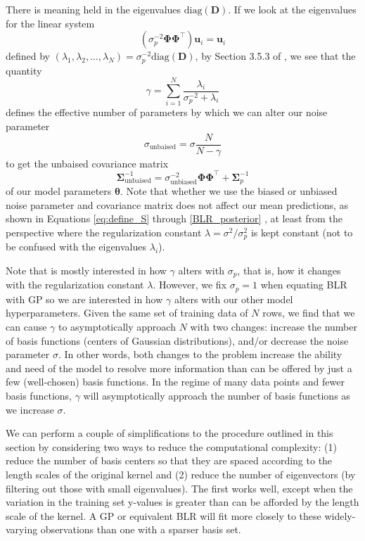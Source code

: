 \documentclass{article}
\begin{document}
There is meaning held in the eigenvalues $\text{diag}(\mathbf{D})$. If we look at the eigenvalues for the linear system \begin{equation}\left(\sigma_p^{-2}\boldsymbol{\Phi}\boldsymbol{\Phi}^\top\right)\mathbf{u}_i=\mathbf{u}_i\end{equation} defined by $(\lambda_1,\lambda_2,\dots,\lambda_N)=\sigma_p^{-2}\text{diag}(\mathbf{D})$, by Section 3.5.3 of \cite{bishop}, we see that the quantity
\begin{equation}
\gamma=\sum_{i=1}^{N}\frac{\lambda_i}{\sigma_p^{-2} + \lambda_i}
\end{equation} defines the effective number of parameters by which we can alter our noise parameter \begin{equation}\sigma_\text{unbaised}=\sigma\frac{N}{N-\gamma}\end{equation} to get the unbaised covariance matrix \begin{equation}\boldsymbol{\Sigma}_\text{unbaised}^{-1}=\sigma_\text{unbiased}^{-2}\boldsymbol{\Phi}\boldsymbol{\Phi}^\top+\boldsymbol{\Sigma}_p^{-1}\end{equation} of our model parameters $\boldsymbol{\theta}$. Note that whether we use the biased or unbiased noise parameter and covariance matrix does not affect our mean predictions, as shown in Equations \ref{eq:define_S} through \ref{BLR_posterior} , at least from the perspective where the regularization constant $\lambda=\sigma^2/\sigma_p^2$ is kept constant (not to be confused with the eigenvalues  $\lambda_i$).

Note that \cite{bishop} is mostly interested in how $\gamma$ alters with $\sigma_p$, that is, how it changes with the regularization constant $\lambda$. However, we fix $\sigma_p=1$ when equating BLR with GP so we are interested in how $\gamma$ alters with our other model hyperparameters. Given the same set of training data of $N$ rows, we find that we can cause $\gamma$ to asymptotically approach $N$ with two changes: increase the number of basis functions (centers of Gaussian distributions), and/or decrease the noise parameter $\sigma$. In other words, both changes to the problem increase the ability and need of the model to resolve more information than can be offered by just a few (well-chosen) basis functions. In the regime of many data points and fewer basis functions, $\gamma$ will asymptotically approach the number of basis functions as we increase $\sigma$.

We can perform a couple of simplifications to the procedure outlined in this section by considering two ways to reduce the computational complexity: (1) reduce the number of basis centers so that they are spaced according to the length scales of the original kernel and (2) reduce the number of eigenvectors (by filtering out those with small eigenvalues). The first works well, except when the variation in the training set y-values is greater than can be afforded by the length scale of the kernel. A GP or equivalent BLR will fit more closely to these widely-varying observations than one with a sparser basis set. 
\end{document}
